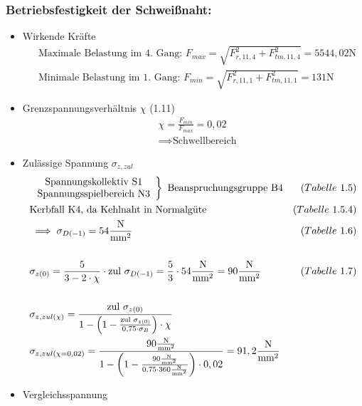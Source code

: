 \subsubsection{Betriebsfestigkeit der Schweißnaht:}
\begin{itemize}
\item Wirkende Kräfte
	\begin{align*}
	&\text{Maximale Belastung im 4. Gang: }F_{max} = \sqrt{F_{r,11,4}^2 + F_{tm,11,4}^2 } = 5544,02 \text{N} \\
	&\text{Minimale Belastung im 1. Gang: } F_{min} = \sqrt{F_{r,11,1}^2 + F_{tm,11,1}^2 } = 131 \text{N} 
	\end{align*}
\item Grenzspannungsverhältnis $\chi$ \hfill (1.11)
	\begin{align*}
	& \chi = \frac{F_{min}}{F_{max}} = 0,02 \\
	& \implies \text{Schwellbereich}
\end{align*}
\item Zulässige Spannung $\sigma_{z,zul}$ 
	\begin{align*}
	&\left. \begin{array}{c} \text{Spannungskollektiv S1}\\\text{Spannungsspielbereich N3} \end{array} \right\} \text{ Beanspruchungsgruppe B4} &(Tabelle\text{ }1.5)\\
	&\text{Kerbfall K4, da Kehlnaht in Normalgüte}  &(Tabelle \text{ }1.5.4) \\
	&\implies \sigma_{D(-1)} = 54 \frac{\text{N}}{\text{mm}^2} &(Tabelle\text{ } 1.6) \\ \\
	&\sigma_{z(0)} = \frac{5}{3-2 \cdot \chi} \cdot \text{zul } \sigma_{D(-1)} = \frac{5}{3} \cdot 54 \frac{\text{N}}{\text{mm}^2} = 90 \frac{\text{N}}{\text{mm}^2} &(Tabelle\text{ } 1.7) \\ \\
	&\sigma_{z,zul (\chi)} = \frac{\text{zul } \sigma_{z(0)}}{1- \left( 1 - \frac{\text{zul } \sigma_{z(0)}}{0,75 \cdot \sigma_B} \right)\cdot \chi}  \\
	&\sigma_{z,zul (\chi = 0,02)} = \frac{90 \frac{\text{N}}{\text{mm}^2}}{1- \left( 1 - \frac{90 \frac{\text{N}}{\text{mm}^2}}{0,75 \cdot 360\frac{\text{N}}{\text{mm}^2}} \right)\cdot 0,02} = 91,2 \frac{\text{N}}{\text{mm}^2} 
	\end{align*}
\item Vergleichsspannung
	\begin{align*}

\end{align*}
\end{itemize}
